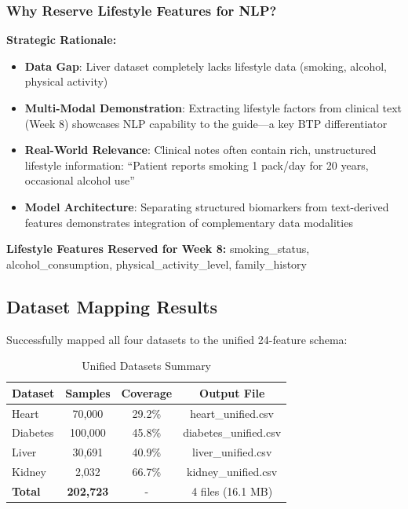 \documentclass[11pt,a4paper]{article}
\begin{document}
\subsubsection{Why Reserve Lifestyle Features for NLP?}

\textbf{Strategic Rationale:}
\begin{itemize}
    \item \textbf{Data Gap}: Liver dataset completely lacks lifestyle data (smoking, alcohol, physical activity)
    \item \textbf{Multi-Modal Demonstration}: Extracting lifestyle factors from clinical text (Week 8) showcases NLP capability to the guide—a key BTP differentiator
    \item \textbf{Real-World Relevance}: Clinical notes often contain rich, unstructured lifestyle information: ``Patient reports smoking 1 pack/day for 20 years, occasional alcohol use''
    \item \textbf{Model Architecture}: Separating structured biomarkers from text-derived features demonstrates integration of complementary data modalities
\end{itemize}

\textbf{Lifestyle Features Reserved for Week 8:} smoking\_status, alcohol\_consumption, physical\_activity\_level, family\_history

\subsection{Dataset Mapping Results}

Successfully mapped all four datasets to the unified 24-feature schema:

\begin{table}[H]
\centering
\caption{Unified Datasets Summary}
\begin{tabular}{lccc}
\toprule
\textbf{Dataset} & \textbf{Samples} & \textbf{Coverage} & \textbf{Output File} \\
\midrule
Heart & 70,000 & 29.2\% & heart\_unified.csv \\
Diabetes & 100,000 & 45.8\% & diabetes\_unified.csv \\
Liver & 30,691 & 40.9\% & liver\_unified.csv \\
Kidney & 2,032 & 66.7\% & kidney\_unified.csv \\
\midrule
\textbf{Total} & \textbf{202,723} & - & 4 files (16.1 MB) \\
\bottomrule
\end{tabular}
\end{table}
\end{document}
